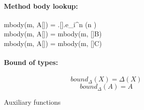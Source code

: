 \begin{figure}[H]
{\begin{minipage}{\linewidth}
			\paragraph{Method body lookup:}
				\begin{mathpar}
						{mbody(m, A[]) = .[].e_i^n (n \in {})} \\

						{mbody(m, A[]) = mbody(m, []B)}\\

						{mbody(m, A[]) = mbody(m, []C)}\\
				\end{mathpar}

			\paragraph{Bound of types:}
					\[bound_\Delta(X) = \Delta(X) \]
					\[bound_\Delta(A) = A \]
    \end{minipage}
  }
	\caption{Auxiliary functions}
	\label{fig:auxFunctions}
\end{figure}

